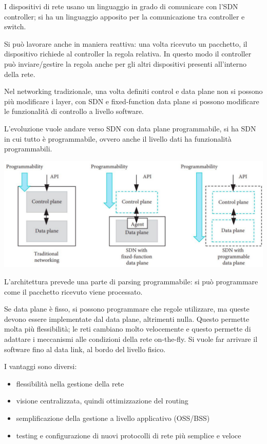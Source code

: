I dispositivi di rete usano un linguaggio in grado di comunicare con l'SDN controller; si ha un linguaggio apposito per la comunicazione tra controller e switch.

Si può lavorare anche in maniera reattiva: una volta ricevuto un pacchetto, il dispositivo richiede al controller la regola relativa. In questo modo il controller può inviare/gestire la regola anche per gli altri dispositivi presenti all'interno della rete.

Nel networking tradizionale, una volta definiti control e data plane non si possono più modificare i layer, con SDN e fixed-function data plane si possono modificare le funzionalità di controllo a livello software. 

L'evoluzione vuole andare verso SDN con data plane programmabile, si ha SDN in cui tutto è programmabile, ovvero anche il livello dati ha funzionalità programmabili.

\begin{center}
	\includegraphics[width=0.95\linewidth]{img/5g/sdn2}
\end{center}

L'architettura prevede una parte di parsing programmabile: si può programmare come il pacchetto ricevuto viene processato. 

Se data plane è fisso, si possono programmare che regole utilizzare, ma queste devono essere implementate dal data plane, altrimenti nulla. Questo permette molta più flessibilità; le reti cambiano molto velocemente e questo permette di adattare i meccanismi alle condizioni della rete on-the-fly. Si vuole far arrivare il software fino al data link, al bordo del livello fisico.

I vantaggi sono diversi:
\begin{itemize}
	\item flessibilità nella gestione della rete

	\item visione centralizzata, quindi ottimizzazione del routing

	\item semplificazione della gestione a livello applicativo (OSS/BSS)

	\item testing e configurazione di nuovi protocolli di rete più semplice e veloce
\end{itemize}

